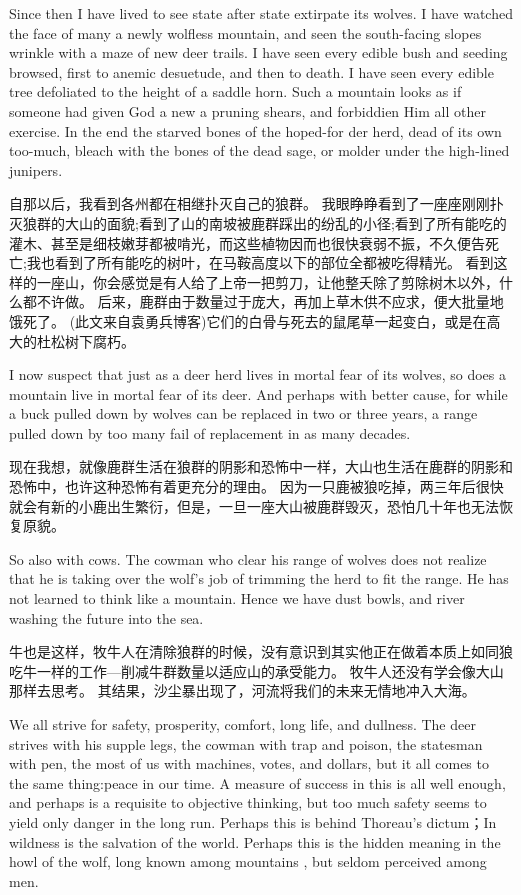 \documentclass[cs4size, a4paper, 12pt]{article}
\newcounter{numpar}
\newcommand*{\newpar}{\numpar{}}
\begin{document}
	\newpar Since then I have lived to see state after state extirpate its wolves. I have watched the face of many a newly wolfless mountain, and seen the south-facing slopes wrinkle with a maze of new deer trails. I have seen every edible bush and seeding browsed, first to anemic desuetude, and then to death. I have seen every edible tree defoliated to the height of a saddle horn. Such a mountain looks as if someone had given God a new a pruning shears, and forbiddien Him all other exercise. In the end the starved bones of the hoped-for der herd, dead of its own too-much, bleach with the bones of the dead sage, or molder under the high-lined junipers. 
	
	自那以后，我看到各州都在相继扑灭自己的狼群。 我眼睁睁看到了一座座刚刚扑灭狼群的大山的面貌;看到了山的南坡被鹿群踩出的纷乱的小径;看到了所有能吃的灌木、甚至是细枝嫩芽都被啃光，而这些植物因而也很快衰弱不振，不久便告死亡;我也看到了所有能吃的树叶，在马鞍高度以下的部位全都被吃得精光。 看到这样的一座山，你会感觉是有人给了上帝一把剪刀，让他整夭除了剪除树木以外，什么都不许做。 后来，鹿群由于数量过于庞大，再加上草木供不应求，便大批量地饿死了。 (此文来自袁勇兵博客)它们的白骨与死去的鼠尾草一起变白，或是在高大的杜松树下腐朽。 
	
	\newpar I now suspect that just as a deer herd lives in mortal fear of its wolves, so does a mountain live in mortal fear of its deer. And perhaps with better cause, for while a buck pulled down by wolves can be replaced in two or three years, a range pulled down by too many fail of replacement in as many decades. 
	
	现在我想，就像鹿群生活在狼群的阴影和恐怖中一样，大山也生活在鹿群的阴影和恐怖中，也许这种恐怖有着更充分的理由。 因为一只鹿被狼吃掉，两三年后很快就会有新的小鹿出生繁衍，但是，一旦一座大山被鹿群毁灭，恐怕几十年也无法恢复原貌。 
	
	\newpar So also with cows. The cowman who clear his range of wolves does not realize that he is taking over the wolf’s job of trimming the herd to fit the range. He has not learned to think like a mountain. Hence we have dust bowls, and river washing the future into the sea.
	
	牛也是这样，牧牛人在清除狼群的时候，没有意识到其实他正在做着本质上如同狼吃牛一样的工作—削减牛群数量以适应山的承受能力。 牧牛人还没有学会像大山那样去思考。 其结果，沙尘暴出现了，河流将我们的未来无情地冲入大海。 
	
	\newpar We all strive for safety, prosperity, comfort, long life, and dullness. The deer strives with his supple legs, the cowman with trap and poison, the statesman with pen, the most of us with machines, votes, and dollars, but it all comes to the same thing:peace in our time. A measure of success in this is all well enough, and perhaps is a requisite to objective thinking, but too much safety seems to yield only danger in the long run. Perhaps this is behind Thoreau’s dictum；In wildness is the salvation of the world. Perhaps this is the hidden meaning in the howl of the wolf, long known among mountains , but seldom perceived among men. 
	
\end{document}
